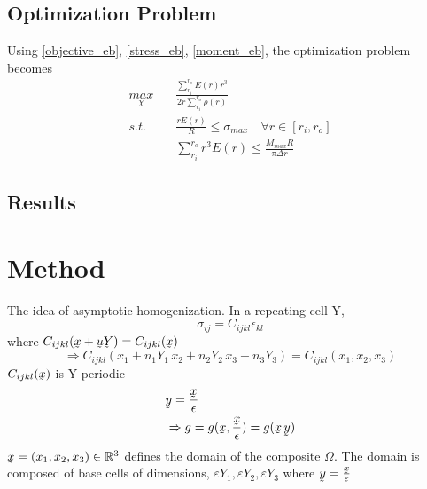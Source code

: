 \documentclass[10pt]{article}
\begin{document}
\subsection{Optimization Problem}
Using \eqref{objective_eb}, \eqref{stress_eb}, \eqref{moment_eb}, the optimization problem becomes
\begin{equation}
\begin{split}
\underset{\chi}{max} \quad& \frac{\sum^{r_o}_{r_i}E(r)r^3}{2 r\sum^{r_o}_{r_i}\rho(r)}\\
s.t. \quad& \frac{rE(r)}{R}\leq \sigma_{max} \quad \forall r \in [r_i, r_o]\\
& \sum_{r_i}^{r_o}r^3E(r)\leq \frac{M_{max}R}{\pi\Delta r}
\end{split}
\end{equation}

\subsection{Results}









\newpage
\section{Method}
The idea of asymptotic homogenization.
In a repeating cell Y,
\begin{equation}
	\label{First}
	\sigma_{ij} = C_{ijkl}\epsilon_{kl}	
\end{equation}
where $C_{ijkl}(\underaccent{\tilde}{x}+\underaccent{\tilde}{u}\underaccent{\tilde}{Y})=C_{ijkl}(\underaccent{\tilde}{x})$
\begin{equation}
\Rightarrow C_{ijkl}(x_1+n_1Y_1\, x_2+n_2Y_2\,x_3+n_3Y_3) = C_{ijkl}(x_1,x_2,x_3)
\end{equation}
$C_{ijkl}(\underaccent{\tilde}{x}) $ is Y-periodic
\begin{eqnarray}
&\underaccent{\tilde}{y} = \frac{\underaccent{\tilde}{x}}{\epsilon}\\
&\Rightarrow g = g(\underaccent{\tilde}{x},\frac{\underaccent{\tilde}{x}}{\epsilon}) = g(\underaccent{\tilde}{x} \,\underaccent{\tilde}{y})
\end{eqnarray}
$\underaccent{\tilde}{x} = (x_1, x_2, x_3) \in \mathbb{R}^3$ defines the domain of the composite $\Omega$. The domain is composed of base cells of dimensions, $\varepsilon Y_1 , \varepsilon Y_2,\varepsilon Y_3$ where $\underaccent{\tilde}{y}=\frac{\underaccent{\tilde}{x}}{\varepsilon}$
\end{document}
